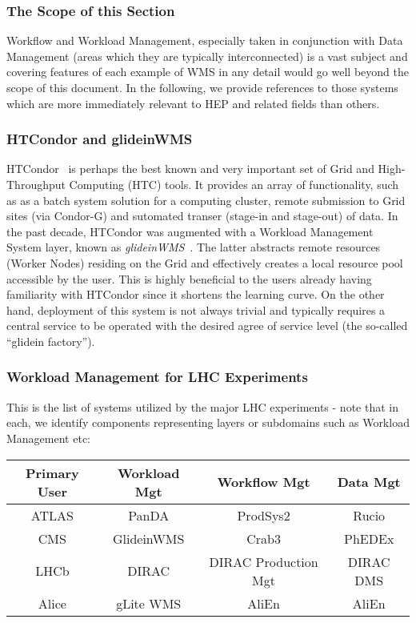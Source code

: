 \subsubsection{The Scope of this Section}
Workflow and Workload Management, especially taken in conjunction with Data Management (areas which they are typically interconnected) is a vast
subject and  covering features of each example of WMS in any detail would go well beyond the scope of this document. In the following, we provide references
to those systems which are more immediately relevant to HEP and related fields than others.

\subsubsection{HTCondor and glideinWMS}
\label{htcondor}
HTCondor~\cite{htcondor} is perhaps the best known and  very important set of Grid and High-Throughput Computing (HTC) tools. It provides an array of functionality, such as
as a batch system solution for a computing cluster, remote submission to Grid sites (via Condor-G) and sutomated transer (stage-in and stage-out) of data.
In the past decade, HTCondor was augmented with a  Workload Management System layer, known as \textit{glideinWMS}~\cite{glideinwms}. The latter abstracts remote resources (Worker Nodes) residing on the Grid
and effectively creates a local resource pool accessible by the user. This is highly beneficial to the users already having familiarity with HTCondor since it shortens the learning curve. On the other hand,
deployment of this system is not always trivial and typically requires a central service to be operated with the desired agree of service level (the so-called ``glidein factory'').

\subsubsection{Workload Management for LHC Experiments}
This is the list of systems utilized by the major LHC experiments - note that in each, we identify components representing layers or subdomains such as Workload Management etc:

\begin{center}
  \begin{tabular}{ c | c | c | c }
    \hline
    \textbf{Primary User} & \textbf{Workload Mgt} & \textbf{Workflow Mgt} & \textbf{Data Mgt}\\ \hline \hline
    ATLAS & PanDA & ProdSys2 & Rucio\\ \hline
    CMS  & GlideinWMS & Crab3 & PhEDEx\\ \hline
    LHCb  & DIRAC & DIRAC Production Mgt & DIRAC DMS\\ \hline
    Alice  & gLite WMS & AliEn & AliEn\\ 
    \hline
  \end{tabular}
\end{center}

